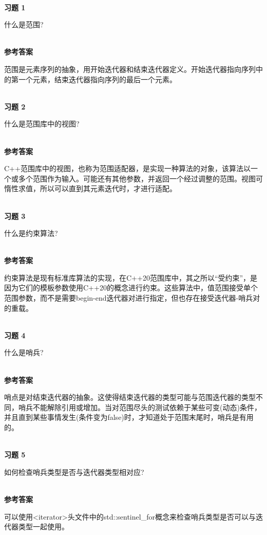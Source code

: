 \hspace*{\fill} \\ %
\noindent
\textbf{习题 1}

什么是范围?

\hspace*{\fill} \\ %
\noindent
\textbf{参考答案}

范围是元素序列的抽象，用开始迭代器和结束迭代器定义。开始迭代器指向序列中的第一个元素，结束迭代器指向序列的最后一个元素。


\hspace*{\fill} \\ %
\noindent
\textbf{习题 2}

什么是范围库中的视图?

\hspace*{\fill} \\ %
\noindent
\textbf{参考答案}

C++范围库中的视图，也称为范围适配器，是实现一种算法的对象，该算法以一个或多个范围作为输入。可能还有其他参数，并返回一个经过调整的范围。视图可惰性求值，所以可以直到其元素迭代时，才进行适配。

\hspace*{\fill} \\ %
\noindent
\textbf{习题 3}

什么是约束算法?

\hspace*{\fill} \\ %
\noindent
\textbf{参考答案}

约束算法是现有标准库算法的实现，在C++20范围库中，其之所以“受约束”，是因为它们的模板参数使用C++20的概念进行约束。这些算法中，值范围接受单个范围参数，而不是需要begin-end迭代器对进行指定，但也存在接受迭代器-哨兵对的重载。

\hspace*{\fill} \\ %
\noindent
\textbf{习题 4}

什么是哨兵?

\hspace*{\fill} \\ %
\noindent
\textbf{参考答案}

哨点是对结束迭代器的抽象。这使得结束迭代器的类型可能与范围迭代器的类型不同，哨兵不能解除引用或增加。当对范围尽头的测试依赖于某些可变(动态)条件，并且直到某些事情发生(条件变为false)时，才知道处于范围末尾时，哨兵是有用的。

\hspace*{\fill} \\ %
\noindent
\textbf{习题 5}

如何检查哨兵类型是否与迭代器类型相对应?

\hspace*{\fill} \\ %
\noindent
\textbf{参考答案}

可以使用<iterator>头文件中的std::sentinel\_for概念来检查哨兵类型是否可以与迭代器类型一起使用。












